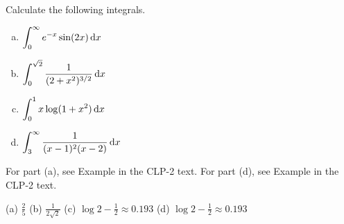 \begin{question}[2001D]
Calculate the following integrals.
\begin{enumerate}[(a)]
\item
$\displaystyle\int_0^\infty e^{-x} \sin(2x)\,\mathrm{d}x$
\item
 $\displaystyle\int_0^{\sqrt{2}}\frac{1}{(2+x^2)^{3/2}}\,\mathrm{d}x$
\item
$\displaystyle\int_0^1 x\log(1+x^2)\,\mathrm{d}x$
\item
$\displaystyle\int_3^\infty\frac{1}{(x-1)^2(x-2)}\,\mathrm{d}x$
\end{enumerate}
\end{question}

\begin{hint}
For part (a), see  Example  in the
CLP-2 text.
For part (d), see  Example  in the
CLP-2 text.

\end{hint}

\begin{answer} (a)
$\displaystyle\frac{2}{5}$
\qquad (b)
$\displaystyle\frac{1}{2\sqrt{2}}$
\qquad (c)
$\displaystyle\log 2-\frac{1}{2}\approx 0.193$
\qquad (d)
$\displaystyle\log 2-\frac{1}{2}\approx0.193$
\end{answer}

